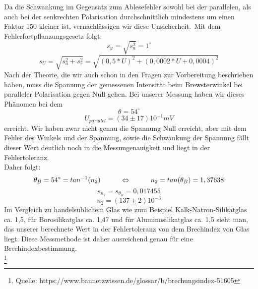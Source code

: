 Da die Schwankung im Gegensatz zum Ablesefehler sowohl bei der parallelen, als auch bei der senkrechten Polarisation durchschnittlich mindestens um einen Faktor 150 kleiner ist, vernachlässigen wir diese Unsicherheit.\
Mit dem Fehlerfortpflanzungsgesetz folgt:\
\begin{equation}
s_\varphi=\sqrt{s_a^2}=1^\circ
\end{equation}
\begin{equation}
s_U=\sqrt{s_a^2+s_r^2}=\sqrt{(0,5*U)^2+(0,0002*U+0,0004)^2}
\end{equation}
Nach der Theorie, die wir auch schon in den Fragen zur Vorbereitung beschrieben haben, muss die  Spannung der gemessenen Intensität beim Brewsterwinkel bei paralleler Polarisation gegen Null gehen. Bei unserer Messung haben wir dieses Phänomen bei dem\\
\begin{equation}
\theta = 54^\circ
\end{equation}
\begin{equation}
U_{parallel}=(34\pm17)10^{-1} mV
\end{equation}
erreicht. Wir haben zwar nicht genau die Spannung Null erreicht, aber mit dem Fehler des Winkels und der Spannung, sowie die Schwankung der Spannung fällt dieser Wert deutlich noch in die Messungenauigkeit und liegt in der Fehlertoleranz. \\
Daher folgt:\\
\begin{equation}
\theta_B=54^\circ=tan^{-1}(n_2) \tab \Leftrightarrow \tab n_2=tan(\theta_B)=1,37638
\end{equation}
\begin{equation}
s_{n_2}=s_{\theta_B}=0,017455
\end{equation}
\begin{equation}
n_2=(137\pm2)10^{-3}
\end{equation}
Im Vergleich zu handelsüblichem Glas wie zum Beispiel Kalk-Natron-Silikatglas ca. 1,5, für Borosilikatglas ca. 1,47 und für Aluminosilikatglas ca. 1,5 sieht man, das unserer berechnete Wert in der Fehlertoleranz von dem Brechindex von Glas liegt. Diese Messmethode ist daher ausreichend genau für eine Brechindexbestimmung. \\
\footnote{Quelle: https://www.baunetzwissen.de/glossar/b/brechungsindex-51605}



